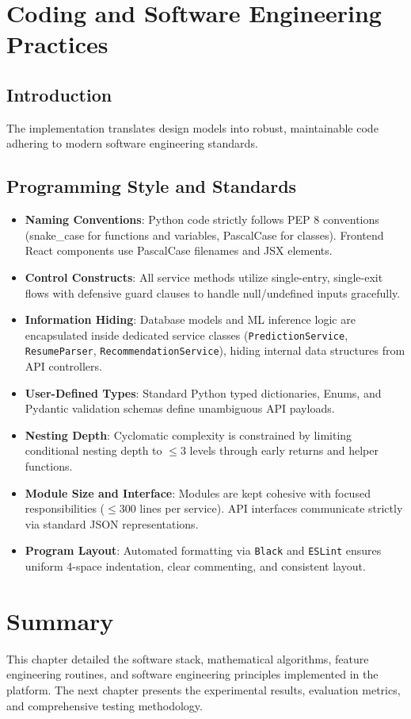 \documentclass[12pt,a4paper]{report}
\begin{document}
\section{Coding and Software Engineering Practices}
\subsection{Introduction}
The implementation translates design models into robust, maintainable code adhering to modern software engineering standards.

\subsection{Programming Style and Standards}
\begin{itemize}
    \item \textbf{Naming Conventions}: Python code strictly follows PEP 8 conventions (snake\_case for functions and variables, PascalCase for classes). Frontend React components use PascalCase filenames and JSX elements.
    \item \textbf{Control Constructs}: All service methods utilize single-entry, single-exit flows with defensive guard clauses to handle null/undefined inputs gracefully.
    \item \textbf{Information Hiding}: Database models and ML inference logic are encapsulated inside dedicated service classes (\texttt{PredictionService}, \texttt{ResumeParser}, \texttt{RecommendationService}), hiding internal data structures from API controllers.
    \item \textbf{User-Defined Types}: Standard Python typed dictionaries, Enums, and Pydantic validation schemas define unambiguous API payloads.
    \item \textbf{Nesting Depth}: Cyclomatic complexity is constrained by limiting conditional nesting depth to $\le 3$ levels through early returns and helper functions.
    \item \textbf{Module Size and Interface}: Modules are kept cohesive with focused responsibilities ($\le 300$ lines per service). API interfaces communicate strictly via standard JSON representations.
    \item \textbf{Program Layout}: Automated formatting via \texttt{Black} and \texttt{ESLint} ensures uniform 4-space indentation, clear commenting, and consistent layout.
\end{itemize}

\section{Summary}
This chapter detailed the software stack, mathematical algorithms, feature engineering routines, and software engineering principles implemented in the platform. The next chapter presents the experimental results, evaluation metrics, and comprehensive testing methodology.
\end{document}

